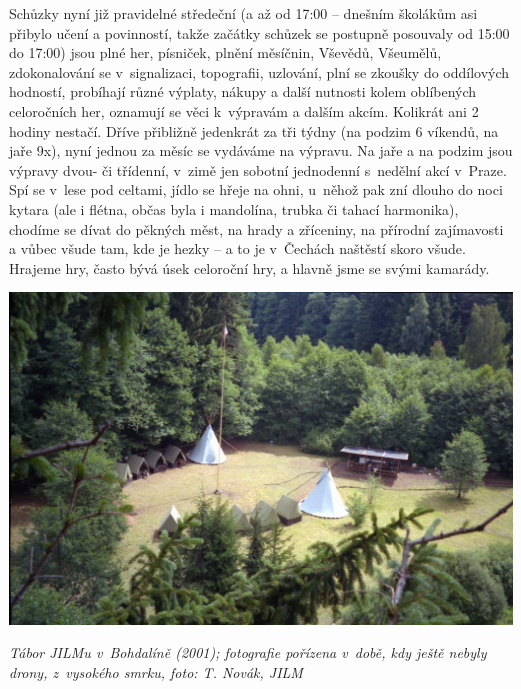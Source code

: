 \documentclass[a5paper, 11pt, twoside]{article}
\begin{document}
Schůzky nyní již pravidelné středeční (a až od 17:00 -- dnešním školákům
asi přibylo učení a povinností, takže začátky schůzek se postupně
posouvaly od 15:00 do 17:00) jsou plné her, písniček, plnění měsíčnin,
Vševědů, Všeumělů, zdokonalování se v~signalizaci, topografii, uzlování,
plní se zkoušky do oddílových hodností, probíhají různé výplaty, nákupy
a další nutnosti kolem oblíbených celoročních her, oznamují se věci
k~výpravám a dalším akcím. Kolikrát ani 2 hodiny nestačí. Dříve přibližně
jedenkrát za tři týdny (na podzim 6 víkendů, na jaře 9x), nyní jednou za
měsíc se vydáváme na výpravu. Na jaře a na podzim jsou výpravy dvou- či
třídenní, v~zimě jen sobotní jednodenní s~nedělní akcí v~Praze. Spí se
v~lese pod celtami, jídlo se hřeje na ohni, u~něhož pak zní dlouho do noci
kytara (ale i flétna, občas byla i mandolína, trubka či tahací
harmonika), chodíme se dívat do pěkných měst, na hrady a zříceniny, na
přírodní zajímavosti a vůbec všude tam, kde je hezky -- a to je
v~Čechách naštěstí skoro všude. Hrajeme hry, často bývá úsek celoroční
hry, a hlavně jsme se svými kamarády.

 \includegraphics[width=\textwidth]{img/80_bohdalin.JPG}

\textit{Tábor JILMu v~Bohdalíně (2001); fotografie pořízena v~době, kdy
ještě nebyly drony, z~vysokého smrku, foto: T. Novák, JILM}
\end{document}
